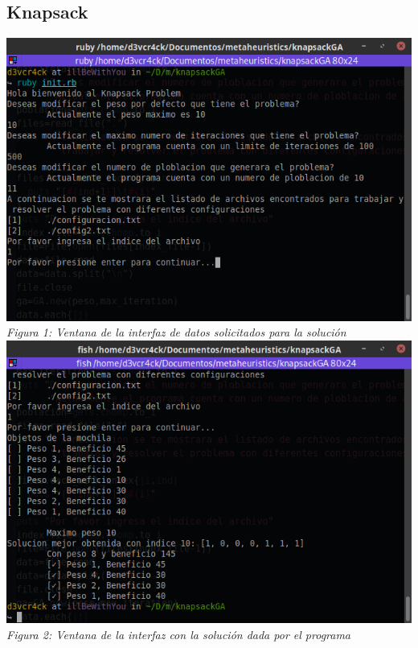 \documentclass[10pt]{article}
\begin{document}
\subsection{Knapsack}
\begin{center}
  \includegraphics[scale=0.5]{imgs/ventana-knapsack.png}
  \\\textit{Figura 1: Ventana de la interfaz de datos solicitados para la solución}
  \\
  \includegraphics[scale=0.5]{imgs/ventana-knapsack-sol.png}
  \\\textit{Figura 2: Ventana de la interfaz con la solución dada por el programa}
\end{center}
\end{document}
